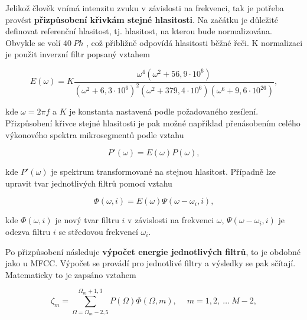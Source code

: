Jelikož člověk vnímá intenzitu zvuku v závislosti na frekvenci, tak je potřeba provést \textbf{přizpůsobení křivkám stejné hlasitosti}. Na začátku je důležité definovat referenční hlasitost, tj. hlasitost, na kterou bude normalizována. Obvykle se volí $40\ Ph$ \cite{Psutka2006}, což přibližně odpovídá hlasitosti běžné řeči. K normalizaci je použit inverzní filtr popsaný vztahem

\begin{equation}
  E\left(\omega\right) = K \frac{\omega^4\left(\omega^2 + 56,9 \cdot 10^6\right)}{\left(\omega^2 + 6,3 \cdot 10^6\right)^2\left(\omega^2 + 379,4 \cdot 10^6\right)\left(\omega^6 + 9,6 \cdot 10^{26}\right)},
  \label{eq:asr:plp:filter}
\end{equation}

\noindent kde $\omega = 2\pi f$ a $K$ je konstanta nastavená podle požadovaného zesílení. Přizpůsobení křivce stejné hlasitosti je pak možné například přenásobením celého výkonového spektra mikrosegmentů podle vztahu

\begin{equation}
  P'\left(\omega\right) = E\left(\omega\right)P\left(\omega\right),
  \label{eq:asr:plp:filter:application1}
\end{equation}

\noindent kde $P'\left(\omega\right)$ je spektrum transformované na stejnou hlasitost. Případně lze upravit tvar jednotlivých filtrů pomocí vztahu

\begin{equation}
  \Phi\left(\omega, i\right) = E\left(\omega\right)\Psi\left(\omega - \omega_i, i\right),
  \label{eq:asr:plp:filter:application2}
\end{equation}

\noindent kde $\Phi\left(\omega, i\right)$ je nový tvar filtru $i$ v závislosti na frekvenci $\omega$, $\Psi\left(\omega - \omega_i, i\right)$ je odezva filtru $i$ se středovou frekvencí $\omega_i$.

Po přizpůsobení následuje \textbf{výpočet energie jednotlivých filtrů}, to je obdobné jako u MFCC. Výpočet se provádí pro jednotlivé filtry a výsledky se pak sčítají. Matematicky to je zapsáno vztahem

\begin{equation}
  \zeta_m = \sum_{\Omega = \Omega_m - 2,5}^{\Omega_m + 1,3} P\left(\Omega\right)\Phi\left(\Omega, m\right), \quad\ m=1, 2,\ \dots\ M - 2,
  \label{eq:asr:plp:energy}
\end{equation}

